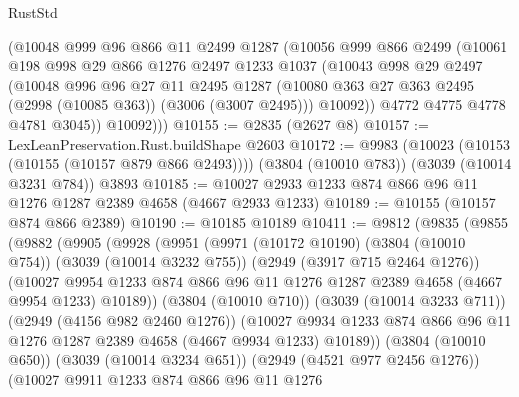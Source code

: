 \begin{lexlean}{RustStd}
\begin{coremodule}
        (@10048
          @999
          @96
          @866
          @11
          @2499
          @1287
          (@10056
            @999
            @866
            @2499
            (@10061
              @198
              @998
              @29
              @866
              @1276
              @2497
              @1233
              @1037
              (@10043
                @998
                @29
                @2497
                (@10048
                  @996
                  @96
                  @27
                  @11
                  @2495
                  @1287
                  (@10080 @363 @27 @363 @2495 (@2998 (@10085 @363)) (@3006 (@3007 @2495)))
                  @10092))
              @4772
              @4775
              @4778
              @4781
              @3045))
          @10092)))
@10155 := @2835 (@2627 @8)
@10157 := LexLeanPreservation.Rust.buildShape @2603
@10172 := @9983
    (@10023 (@10153 (@10155 (@10157 @879 @866 @2493))))
    (@3804 (@10010 @783))
    (@3039 (@10014 @3231 @784))
    @3893
@10185 := @10027 @2933 @1233 @874 @866 @96 @11 @1276 @1287 @2389 @4658 (@4667 @2933 @1233)
@10189 := @10155 (@10157 @874 @866 @2389)
@10190 := @10185 @10189
@10411 := @9812
    (@9835
      (@9855
        (@9882
          (@9905
            (@9928
              (@9951
                (@9971
                  (@10172 @10190)
                  (@3804 (@10010 @754))
                  (@3039 (@10014 @3232 @755))
                  (@2949 (@3917 @715 @2464 @1276))
                  (@10027
                    @9954
                    @1233
                    @874
                    @866
                    @96
                    @11
                    @1276
                    @1287
                    @2389
                    @4658
                    (@4667 @9954 @1233)
                    @10189))
                (@3804 (@10010 @710))
                (@3039 (@10014 @3233 @711))
                (@2949 (@4156 @982 @2460 @1276))
                (@10027
                  @9934
                  @1233
                  @874
                  @866
                  @96
                  @11
                  @1276
                  @1287
                  @2389
                  @4658
                  (@4667 @9934 @1233)
                  @10189))
              (@3804 (@10010 @650))
              (@3039 (@10014 @3234 @651))
              (@2949 (@4521 @977 @2456 @1276))
              (@10027
                @9911
                @1233
                @874
                @866
                @96
                @11
                @1276

\end{coremodule}
\end{lexlean}
